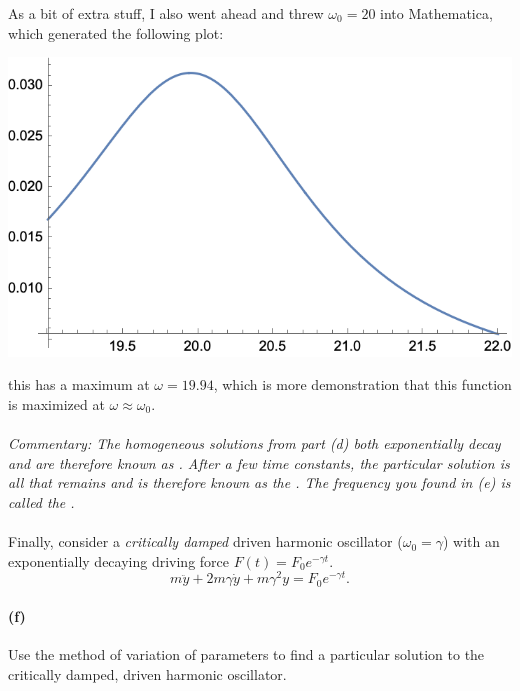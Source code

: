 \documentclass{article}
\begin{document}
\begin{solution}
	As a bit of extra stuff, I also went ahead and threw $\omega_0 = 20$ into Mathematica, which generated
	the following plot:
	\begin{center}
		\includegraphics[scale=1]{2e.png}
	\end{center}
	this has a maximum at $\omega = 19.94$, which is more demonstration that this function is maximized at 
	$\omega \approx \omega_0$.
\end{solution}
\paragraph{}
\noindent\emph{Commentary: The homogeneous solutions from part (d) both exponentially decay and are therefore known as .  
After a few time constants, the particular solution is all that remains and is therefore known as the .  The frequency you found in (e) is called the
.}

\phline
\paragraph{}
Finally, consider a \emph{critically damped} driven harmonic oscillator ($\omega_{0}=\gamma$) with an exponentially decaying driving force $F(t) = F_{0}e^{-\gamma t}$.
	\begin{equation}
		m\ddot{y} + 2m\gamma\dot{y} + m\gamma^{2}y = F_{0}e^{-\gamma t}.
	\end{equation}

\paragraph{(f)}
Use the method of {variation of parameters} to find a particular solution to the critically damped, driven harmonic oscillator.
\end{document}
